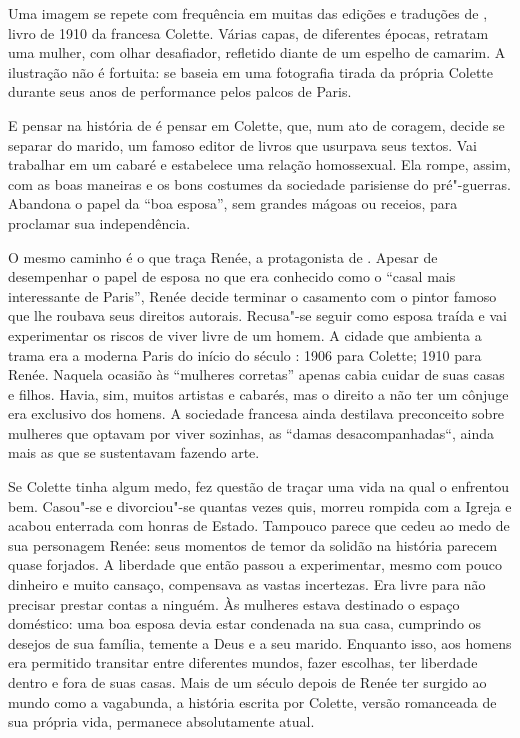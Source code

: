 \begin{multicols}{2}
\noindent{}Uma imagem se repete com frequência em muitas das edições e traduções de {}, livro de 1910 da francesa Colette. Várias capas, de diferentes épocas, retratam uma mulher, com olhar desafiador, refletido diante de um espelho de camarim. A ilustração não é fortuita: se baseia em uma fotografia tirada da própria Colette durante seus anos de performance pelos palcos de Paris. 

E pensar na história de {} é pensar em Colette, que, num ato de coragem, decide se separar do marido, um famoso editor de livros que usurpava seus textos. Vai trabalhar em um cabaré e estabelece uma relação homossexual. Ela rompe, assim, com as boas maneiras e os bons costumes da sociedade parisiense do pré"-guerras. Abandona o papel da “boa esposa”, sem grandes mágoas ou receios, para proclamar sua independência.

O mesmo caminho é o que traça Renée, a protagonista de {}. Apesar de desempenhar o papel de esposa no que era conhecido como o “casal mais interessante de Paris”, Renée decide terminar o casamento com o pintor famoso que lhe roubava seus direitos autorais. Recusa"-se seguir como esposa traída e vai experimentar os riscos de viver livre de um homem. A cidade que ambienta a trama era a moderna Paris do início do século : 1906 para Colette; 1910 para Renée. Naquela ocasião às “mulheres corretas” apenas cabia cuidar de suas casas e filhos. Havia, sim, muitos artistas e cabarés, mas o direito a não ter um cônjuge era exclusivo dos homens. A sociedade francesa ainda destilava preconceito sobre mulheres que optavam por viver sozinhas, as “damas desacompanhadas“, ainda mais as que se sustentavam fazendo arte.

Se Colette tinha algum medo, fez questão de traçar uma vida na qual o enfrentou bem. Casou"-se e divorciou"-se quantas vezes quis, morreu rompida com a Igreja e acabou enterrada com honras de Estado. Tampouco parece que cedeu ao medo de sua personagem Renée: seus momentos de temor da solidão na história parecem quase forjados. A liberdade que então passou a experimentar, mesmo com pouco dinheiro
e muito cansaço, compensava as vastas incertezas. Era livre para não precisar prestar contas a ninguém. Às mulheres estava destinado o espaço doméstico: uma boa esposa devia estar condenada na sua casa, cumprindo os desejos de sua família, temente a Deus e a seu marido. Enquanto isso, aos homens era permitido transitar entre diferentes mundos, fazer escolhas, ter liberdade dentro e fora de suas casas. Mais de um século depois de Renée ter surgido ao mundo como a vagabunda, a história escrita por Colette, versão romanceada de sua própria vida, permanece absolutamente atual.


\end{multicols}
